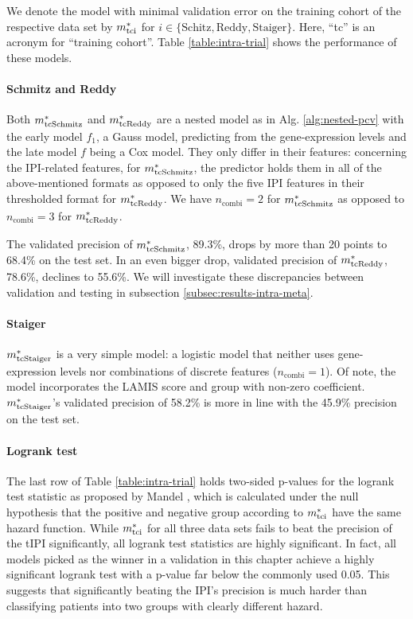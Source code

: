 We denote the model with minimal validation error on the training cohort of the respective data set 
by $m^*_\text{tci}$ for $i \in \{\text{Schitz}, \text{Reddy}, \text{Staiger}\}$.  Here, ``tc'' is an 
acronym for ``training cohort''. Table \ref{table:intra-trial} shows the performance of these models.

\paragraph{Schmitz and Reddy}
Both $m^*_\text{tcSchmitz}$ and $m^*_\text{tcReddy}$ are a nested 
model as in Alg. \ref{alg:nested-pcv} with the early model $f_1$, a Gauss model, predicting from 
the gene-expression levels and the late model $f$ being a Cox model. They only differ in their 
features: concerning the IPI-related features, for $m^*_\text{tcSchmitz}$, the predictor holds them in
all of the above-mentioned formats as opposed to only the five IPI features in their thresholded 
format for 
$m^*_\text{tcReddy}$. We have $n_\text{combi} = 2$ for $m^*_\text{tcSchmitz}$ as opposed to $n_\text{combi} = 3$ 
for $m^*_\text{tcReddy}$.

The validated precision of $m^*_\text{tcSchmitz}$, \num{89.3}\%, drops by more than \num{20} points 
to \num{68.4}\% on the test set. In an even bigger drop, validated precision of $m^*_\text{tcReddy}$,
\num{78.6}\%, declines to \num{55.6}\%. We will investigate these discrepancies between 
validation and testing in subsection \ref{subsec:results-intra-meta}.

\paragraph{Staiger}
$m^*_\text{tcStaiger}$ is a very simple model: a logistic model that neither uses 
gene-expression levels nor combinations of discrete features ($n_\text{combi} = 1$). Of note, the 
model incorporates the LAMIS score and group with non-zero coefficient. $m^*_\text{tcStaiger}$'s 
validated precision of \num{58.2}\% is more in line with the \num{45.9}\% precision on the test set.

\paragraph{Logrank test}
The last row of Table \ref{table:intra-trial} holds two-sided p-values for the logrank test
statistic as proposed by Mandel \cite{mantel66}, which is calculated under the null hypothesis 
that the positive and negative group according to $m^*_\text{tci}$ have the same hazard function. While 
$m^*_\text{tci}$ for all three data sets fails to beat the precision of the tIPI significantly, all logrank 
test statistics are highly significant. In fact, all models picked as the winner in a validation in this 
chapter achieve a highly significant logrank test with a p-value far below the commonly used \num{0.05}. 
This suggests that significantly beating the IPI's precision is much harder than classifying patients 
into two groups with clearly different hazard. 

